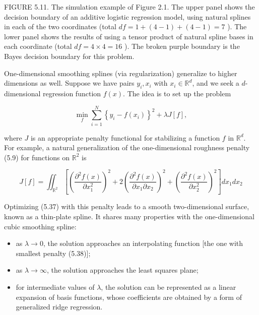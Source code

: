 \documentclass[10pt]{article}
\begin{document}
FIGURE 5.11. The simulation example of Figure 2.1. The upper panel shows the decision boundary of an additive logistic regression model, using natural splines in each of the two coordinates (total $d f=1+(4-1)+(4-1)=7$ ). The lower panel shows the results of using a tensor product of natural spline bases in each coordinate (total $d f=4 \times 4=16$ ). The broken purple boundary is the Bayes decision boundary for this problem.

One-dimensional smoothing splines (via regularization) generalize to higher dimensions as well. Suppose we have pairs $y_{i}, x_{i}$ with $x_{i} \in \mathbb{R}^{d}$, and we seek a $d$-dimensional regression function $f(x)$. The idea is to set up the problem


\begin{equation*}
\min _{f} \sum_{i=1}^{N}\left\{y_{i}-f\left(x_{i}\right)\right\}^{2}+\lambda J[f], \tag{5.37}
\end{equation*}


where $J$ is an appropriate penalty functional for stabilizing a function $f$ in $\mathbb{R}^{d}$. For example, a natural generalization of the one-dimensional roughness penalty (5.9) for functions on $\mathbb{R}^{2}$ is


\begin{equation*}
J[f]=\iint_{\mathbb{R}^{2}}\left[\left(\frac{\partial^{2} f(x)}{\partial x_{1}^{2}}\right)^{2}+2\left(\frac{\partial^{2} f(x)}{\partial x_{1} \partial x_{2}}\right)^{2}+\left(\frac{\partial^{2} f(x)}{\partial x_{2}^{2}}\right)^{2}\right] d x_{1} d x_{2} \tag{5.38}
\end{equation*}


Optimizing (5.37) with this penalty leads to a smooth two-dimensional surface, known as a thin-plate spline. It shares many properties with the one-dimensional cubic smoothing spline:

\begin{itemize}
  \item as $\lambda \rightarrow 0$, the solution approaches an interpolating function [the one with smallest penalty (5.38)];
  \item as $\lambda \rightarrow \infty$, the solution approaches the least squares plane;
  \item for intermediate values of $\lambda$, the solution can be represented as a linear expansion of basis functions, whose coefficients are obtained by a form of generalized ridge regression.
\end{itemize}
\end{document}
